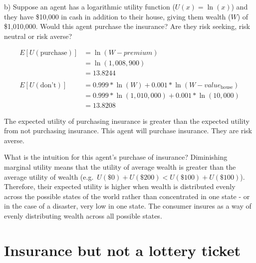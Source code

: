 \documentclass[
  letterpaper,
  DIV=11,
  numbers=noendperiod]{scrreprt}
\begin{document}
b) Suppose an agent has a logarithmic utility function (\(U(x)=\ln(x)\))
and they have \$10,000 in cash in addition to their house, giving them
wealth (\(W\)) of \$1,010,000. Would this agent purchase the insurance?
Are they risk seeking, risk neutral or risk averse?

\begin{tcolorbox}[enhanced jigsaw, title=\textcolor{quarto-callout-tip-color}{\faLightbulb}\hspace{0.5em}{Answer}, toprule=.15mm, colback=white, breakable, titlerule=0mm, colframe=quarto-callout-tip-color-frame, coltitle=black, opacityback=0, rightrule=.15mm, colbacktitle=quarto-callout-tip-color!10!white, bottomtitle=1mm, opacitybacktitle=0.6, arc=.35mm, bottomrule=.15mm, toptitle=1mm, leftrule=.75mm, left=2mm]

\begin{align*}
E[U(\text{purchase})]&=\ln(W-premium) \\
&=\ln(1,008,900) \\
&=13.8244\\
\\
E[U(\text{don't})]&=0.999*\ln(W)+0.001*\ln(W-value_{\text{house}}) \\
&=0.999*\ln(1,010,000)+0.001*\ln(10,000) \\
&=13.8208
\end{align*}

The expected utility of purchasing insurance is greater than the
expected utility from not purchasing insurance. This agent will purchase
insurance. They are risk averse.

What is the intuition for this agent's purchase of insurance?
Diminishing marginal utility means that the utility of average wealth is
greater than the average utility of wealth
(e.g.~\(U(\$0)+U(\$200)<U(\$100)+U(\$100)\)). Therefore, their expected
utility is higher when wealth is distributed evenly across the possible
states of the world rather than concentrated in one state - or in the
case of a disaster, very low in one state. The consumer insures as a way
of evenly distributing wealth across all possible states.

\end{tcolorbox}

\hypertarget{insurance-but-not-a-lottery-ticket}{%
\section{Insurance but not a lottery
ticket}\label{insurance-but-not-a-lottery-ticket}}
\end{document}
